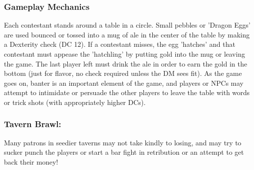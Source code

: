 \documentclass[10pt,a4paper,twoside,twocolumn,openany,nodeprecatedcode]{dndarticle}
\begin{document}
\subsubsection{Gameplay Mechanics}
Each contestant stands around a table in a circle. Small pebbles or 'Dragon Eggs' are used bounced or tossed into a mug of ale in the center of the table by making a Dexterity check (DC 12). If a contestant misses, the egg 'hatches' and that contestant must appease the 'hatchling' by putting gold into the mug or leaving the game. The last player left must drink the ale in order to earn the gold in the bottom (just for flavor, no check required unless the DM sees fit). As the game goes on, banter is an important element of the game, and players or NPCs may attempt to intimidate or persuade the other players to leave the table with words or trick shots (with appropriately higher DCs).
\subsubsection{Tavern Brawl:}
Many patrons in seedier taverns may not take kindly to losing, and may try to sucker punch the players or start a bar fight in retribution or an attempt to get back their money!
\end{document}
